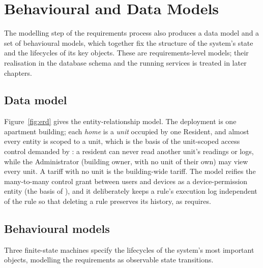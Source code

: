 \section{Behavioural and Data Models}
\label{sec:models}

The modelling step of the requirements process also produces a data model and a set
of behavioural models, which together fix the structure of the system's state and the
lifecycles of its key objects. These are requirements-level models; their realisation
in the database schema and the running services is treated in later chapters.

\subsection{Data model}

Figure~\ref{fig:erd} gives the entity-relationship model. The deployment is one apartment
building; each \emph{home} is a \emph{unit} occupied by one Resident, and almost every
entity is scoped to a unit, which is the basis of the unit-scoped access control demanded
by : a resident can never read another unit's readings or logs, while the
Administrator (building owner, with no unit of their own) may view every unit. A tariff
with no unit is the building-wide tariff. The model reifies the many-to-many control grant
between users and devices as a device-permission entity (the basis of ), and it
deliberately keeps a rule's execution log independent of the rule so that deleting a rule
preserves its history, as  requires.


\subsection{Behavioural models}

Three finite-state machines specify the lifecycles of the system's most important
objects, modelling the requirements as observable state transitions.

